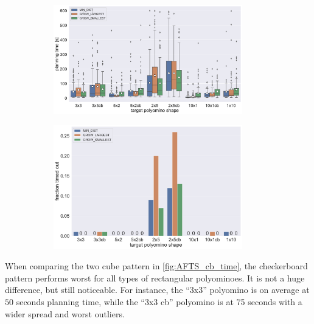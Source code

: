\begin{figure}
	\centering
	\begin{subfigure}[b]{\textwidth}
		\centering
		\includegraphics[width=0.9\textwidth]{figures/plots/AFTS_cb_time.pdf}
		\caption{}
		\label{fig:AFTS_cb_time}
	\end{subfigure}
	
	\begin{subfigure}[b]{\textwidth}
		\centering
		\includegraphics[width=0.9\textwidth]{figures/plots/AFTS_cb_timeout.pdf}
		\caption{}
		\label{fig:AFTS_cb_timeout}
	\end{subfigure}
	\caption[]{}
	\label{fig:AFTS_cb_timestats}
\end{figure}

When comparing the two cube pattern in \autoref{fig:AFTS_cb_time}, the checkerboard pattern performs worst for all types of rectangular polyominoes.
It is not a huge difference, but still noticeable.
For instance, the ``3x3'' polyomino is on average at $50$ seconds planning time, while the ``3x3 cb'' polyomino is at 75 seconds with a wider spread and worst outliers.

